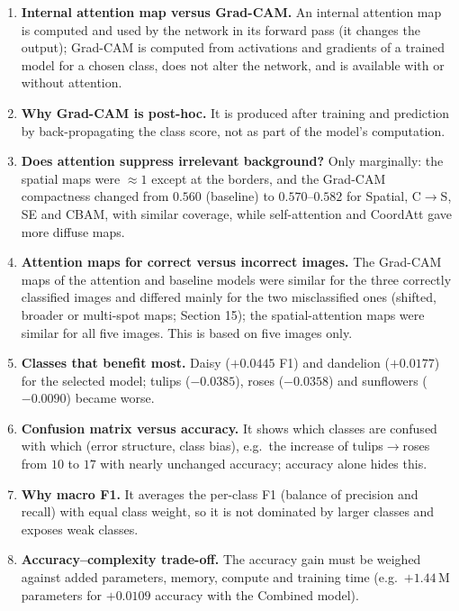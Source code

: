 \documentclass[10pt]{article}
\begin{document}
\begin{enumerate}
\item \textbf{Internal attention map versus Grad-CAM.} An internal attention map is computed and used by the network in its forward pass (it changes the output); Grad-CAM is computed from activations and gradients of a trained model for a chosen class, does not alter the network, and is available with or without attention.

\item \textbf{Why Grad-CAM is post-hoc.} It is produced after training and prediction by back-propagating the class score, not as part of the model's computation.

\item \textbf{Does attention suppress irrelevant background?} Only marginally: the spatial maps were $\approx1$ except at the borders, and the Grad-CAM compactness changed from $0.560$ (baseline) to $0.570$--$0.582$ for Spatial, C$\rightarrow$S, SE and CBAM, with similar coverage, while self-attention and CoordAtt gave more diffuse maps.

\item \textbf{Attention maps for correct versus incorrect images.} The Grad-CAM maps of the attention and baseline models were similar for the three correctly classified images and differed mainly for the two misclassified ones (shifted, broader or multi-spot maps; Section 15); the spatial-attention maps were similar for all five images. This is based on five images only.

\item \textbf{Classes that benefit most.} Daisy ($+0.0445$ F1) and dandelion ($+0.0177$) for the selected model; tulips ($-0.0385$), roses ($-0.0358$) and sunflowers ($-0.0090$) became worse.

\item \textbf{Confusion matrix versus accuracy.} It shows which classes are confused with which (error structure, class bias), e.g.\ the increase of tulips$\rightarrow$roses from $10$ to $17$ with nearly unchanged accuracy; accuracy alone hides this.

\item \textbf{Why macro F1.} It averages the per-class F1 (balance of precision and recall) with equal class weight, so it is not dominated by larger classes and exposes weak classes.

\item \textbf{Accuracy--complexity trade-off.} The accuracy gain must be weighed against added parameters, memory, compute and training time (e.g.\ $+1.44$\,M parameters for $+0.0109$ accuracy with the Combined model).


\end{enumerate}
\end{document}
